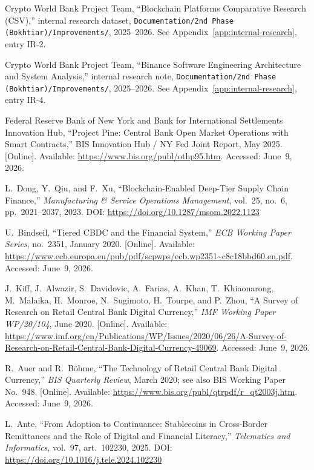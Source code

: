 \documentclass[12pt,a4paper]{report}
\begin{document}
{\begin{enumerate}[label={[\arabic*]}]
\item Crypto World Bank Project Team, ``Blockchain Platforms Comparative Research (CSV),'' internal research dataset, \texttt{Documentation/2nd Phase (Bokhtiar)/Improvements/}, 2025--2026. See Appendix~\ref{app:internal-research}, entry IR-2.

\item Crypto World Bank Project Team, ``Binance Software Engineering Architecture and System Analysis,'' internal research note, \texttt{Documentation/2nd Phase (Bokhtiar)/Improvements/}, 2025--2026. See Appendix~\ref{app:internal-research}, entry IR-4.

\item Federal Reserve Bank of New York and Bank for International Settlements Innovation Hub, ``Project Pine: Central Bank Open Market Operations with Smart Contracts,'' BIS Innovation Hub / NY Fed Joint Report, May 2025. [Online]. Available: \url{https://www.bis.org/publ/othp95.htm}. Accessed: June~9, 2026.

\item L.~Dong, Y.~Qiu, and F.~Xu, ``Blockchain-Enabled Deep-Tier Supply Chain Finance,'' \textit{Manufacturing \& Service Operations Management}, vol.~25, no.~6, pp.~2021--2037, 2023. DOI: \url{https://doi.org/10.1287/msom.2022.1123}

\item U.~Bindseil, ``Tiered CBDC and the Financial System,'' \textit{ECB Working Paper Series}, no.~2351, January 2020. [Online]. Available: \url{https://www.ecb.europa.eu/pub/pdf/scpwps/ecb.wp2351~c8c18bbd60.en.pdf}. Accessed: June~9, 2026.

\item J.~Kiff, J.~Alwazir, S.~Davidovic, A.~Farias, A.~Khan, T.~Khiaonarong, M.~Malaika, H.~Monroe, N.~Sugimoto, H.~Tourpe, and P.~Zhou, ``A Survey of Research on Retail Central Bank Digital Currency,'' \textit{IMF Working Paper WP/20/104}, June 2020. [Online]. Available: \url{https://www.imf.org/en/Publications/WP/Issues/2020/06/26/A-Survey-of-Research-on-Retail-Central-Bank-Digital-Currency-49069}. Accessed: June~9, 2026.

\item R.~Auer and R.~B\"{o}hme, ``The Technology of Retail Central Bank Digital Currency,'' \textit{BIS Quarterly Review}, March 2020; see also BIS Working Paper No.~948. [Online]. Available: \url{https://www.bis.org/publ/qtrpdf/r_qt2003j.htm}. Accessed: June~9, 2026.

\item L.~Ante, ``From Adoption to Continuance: Stablecoins in Cross-Border Remittances and the Role of Digital and Financial Literacy,'' \textit{Telematics and Informatics}, vol.~97, art.~102230, 2025. DOI: \url{https://doi.org/10.1016/j.tele.2024.102230}


\end{enumerate}}
\end{document}
